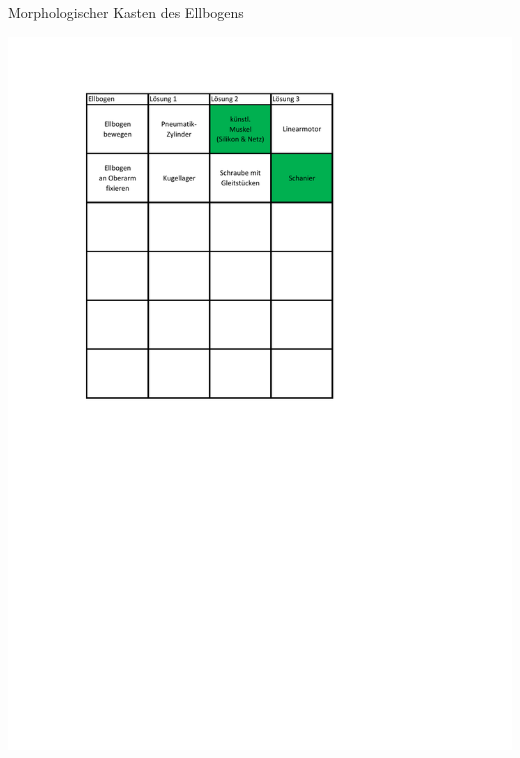 	\begin{table}[h]
		\caption[Morphologischer Kasten des Ellbogens]{Morphologischer Kasten des Ellbogens}
		\centering
		\includegraphics[width=\textwidth]{"Abb/Morphologischer Kasten Ellbogen"}
		\label{fig:morphologische-kasten-ellbogen}
	\end{table}

